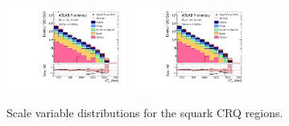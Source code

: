 \begin{figure}[tbph]
\begin{center}
\includegraphics[width=0.35\textwidth]{figures/ATLAS-CONF-2016-078_INT/N-1Plots/AtlasStyle/Preliminary/CRQ_SRJigsawSRS3a_LastCut_CRQ_minusone}
\includegraphics[width=0.35\textwidth]{figures/ATLAS-CONF-2016-078_INT/N-1Plots/AtlasStyle/Preliminary/CRQ_SRJigsawSRS3b_LastCut_CRQ_minusone}
\end{center}
\caption{Scale variable distributions for the squark CRQ regions.}
\label{fig:CRQ_SRJigsawSRS1b_LastCut_CRQ_minusone}
\end{figure}

